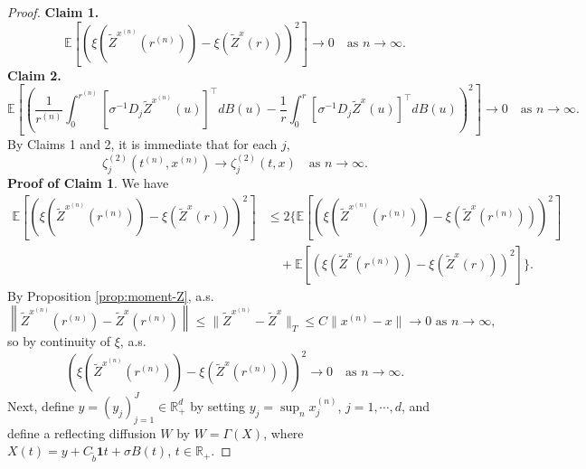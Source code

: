 \documentclass[11pt]{article}
\theoremstyle{definition}
\theoremstyle{plain}
\newcommand{\tb}{\tilde{b}}
\newcommand{\bOne}{\bm{1}}
\begin{document}
\begin{appendices}
\begin{proof}
\textbf{Claim 1.}  
\[
\mathbb{E} \left[ \left( \xi(\tilde{Z}^{x^{(n)}}(r^{(n)})) 
- \xi(\tilde{Z}^x(r)) \right)^2 \right] \to 0 \quad \text{as } n \to \infty.
\]
\textbf{Claim 2.}  
\[
\mathbb{E} \left[ \left( \frac{1}{r^{(n)}}\int_0^{r^{(n)}} \left[\sigma^{-1} D_j \tilde{Z}^{x^{(n)}}(u)\right]^{\top} dB(u) 
- \frac{1}{r}\int_0^r \left[\sigma^{-1} D_j \tilde{Z}^x(u)\right]^{\top} dB(u) \right)^2 \right] \to 0 
\quad \text{as } n \to \infty.
\]
By Claims 1 and 2, it is immediate that for each $j$, 
\[
\zeta^{(2)}_j(t^{(n)}, x^{(n)}) \to \zeta^{(2)}_j(t,x) \quad \text{as } n \to \infty.
\]
\textbf{Proof of Claim 1}. We have
\begin{align*}
\mathbb{E} \left[ \left( \xi(\tilde{Z}^{x^{(n)}}(r^{(n)})) - \xi(\tilde{Z}^x(r)) \right)^2 \right]
& \leq 2 \Bigg\{\mathbb{E} \left[ \left( \xi(\tilde{Z}^{x^{(n)}}(r^{(n)})) - \xi(\tilde{Z}^x(r^{(n)})) \right)^2 \right] \\
& \quad + \mathbb{E} \left[ \left( \xi(\tilde{Z}^x(r^{(n)})) - \xi(\tilde{Z}^x(r)) \right)^2 \right] \Bigg\}.
\end{align*}
By Proposition \ref{prop:moment-Z}, a.s.  
\[
\left\|\tilde{Z}^{x^{(n)}}(r^{(n)}) - \tilde{Z}^x(r^{(n)})\right\| 
\leq \| \tilde{Z}^{x^{(n)}} - \tilde{Z}^x \|_T \leq C \|x^{(n)} - x\| \to 0 \text{ as } n \to \infty,
\]
so by continuity of \( \xi \), a.s.
\[
(\xi(\tilde{Z}^{x^{(n)}}(r^{(n)})) - \xi(\tilde{Z}^x(r^{(n)})))^2 \to 0
\quad \text{as } n \to \infty.
\]
Next, define \( y = (y_j)_{j=1}^J \in \mathbb{R}_+^d \) by  
setting \( y_j = \sup_n x_j^{(n)} \), \( j = 1, \cdots, d \), and define  
a reflecting diffusion \( W \) by \( W = \Gamma(X) \),  
where \( X(t) = y + C_{\tb} \bOne t + \sigma B(t) \), \( t \in \mathbb{R}_+ \).


\end{proof}
\end{appendices}
\end{document}

